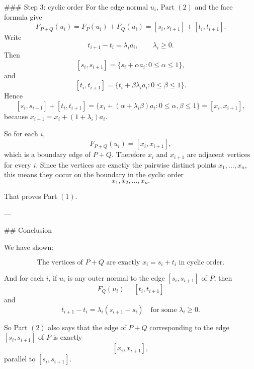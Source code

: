 ### Step 3: cyclic order
For the edge normal \(u_i\), Part \((2)\) and the face formula give
\[
F_{P+Q}(u_i)
=
F_P(u_i)+F_Q(u_i)
=
[s_i,s_{i+1}]+[t_i,t_{i+1}].
\]
Write
\[
t_{i+1}-t_i=\lambda_i a_i,\qquad \lambda_i\ge 0.
\]
Then
\[
[s_i,s_{i+1}]
=
\{s_i+\alpha a_i:0\le \alpha\le 1\},
\]
and
\[
[t_i,t_{i+1}]
=
\{t_i+\beta \lambda_i a_i:0\le \beta\le 1\}.
\]
Hence
\[
[s_i,s_{i+1}]+[t_i,t_{i+1}]
=
\{x_i+(\alpha+\lambda_i\beta)a_i:0\le \alpha,\beta\le 1\}
=
[x_i,x_{i+1}],
\]
because \(x_{i+1}=x_i+(1+\lambda_i)a_i\).

So for each \(i\),
\[
F_{P+Q}(u_i)=[x_i,x_{i+1}],
\]
which is a boundary edge of \(P+Q\). Therefore \(x_i\) and \(x_{i+1}\) are adjacent vertices for every \(i\). Since the vertices are exactly the pairwise distinct points \(x_1,\dots,x_n\), this means they occur on the boundary in the cyclic order
\[
x_1,x_2,\dots,x_n.
\]

That proves Part \((1)\).

---

## Conclusion

We have shown:

\[
\boxed{\text{The vertices of }P+Q\text{ are exactly }x_i=s_i+t_i\text{ in cyclic order.}}
\]

And for each \(i\), if \(u_i\) is any outer normal to the edge \([s_i,s_{i+1}]\) of \(P\), then
\[
\boxed{F_Q(u_i)=[t_i,t_{i+1}]}
\]
and
\[
\boxed{t_{i+1}-t_i=\lambda_i(s_{i+1}-s_i)\quad\text{for some }\lambda_i\ge 0.}
\]

So Part \((2)\) also says that the edge of \(P+Q\) corresponding to the edge \([s_i,s_{i+1}]\) of \(P\) is exactly
\[
[x_i,x_{i+1}],
\]
parallel to \([s_i,s_{i+1}]\).
